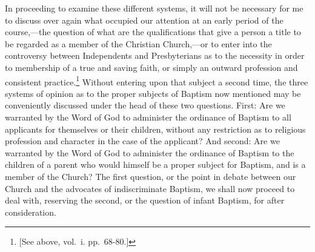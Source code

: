\documentclass[]{book}
\begin{document}
In proceeding to examine these different systems, it will not be necessary for me to discuss over again what occupied our attention at an early period of the course,---the question of what are the qualifications that give a person a title to be regarded as a member of the Christian Church,---or to enter into the controversy between Independents and Presbyterians as to the necessity in order to membership of a true and saving faith, or simply an outward profession and consistent practice.\footnote{{[}See above, vol.~i. pp.~68-80.{]}} Without entering upon that subject a second time, the three systems of opinion as to the proper subjects of Baptism now mentioned may be conveniently discussed under the head of these two questions. First: Are we warranted by the Word of God to administer the ordinance of Baptism to all applicants for themselves or their children, without any restriction as to religious profession and character in the case of the applicant? And second: Are we warranted by the Word of God to administer the ordinance of Baptism to the children of a parent who would himself be a proper subject for Baptism, and is a member of the Church? The first question, or the point in debate between our Church and the advocates of indiscriminate Baptism, we shall now proceed to deal with, reserving the second, or the question of infant Baptism, for after consideration.
\end{document}

